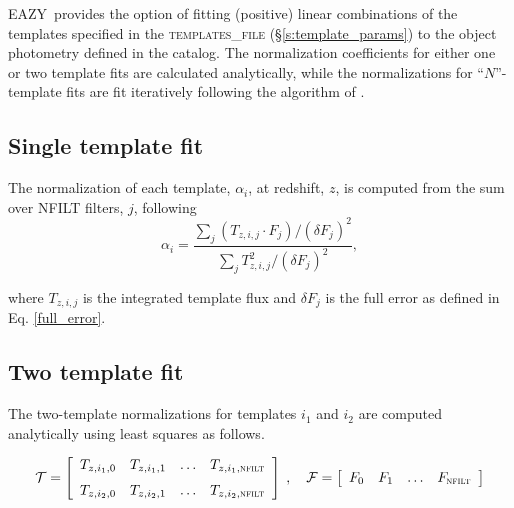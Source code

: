\documentclass[11pt]{article}
\newcommand{\eazy}{\textsc{EAZY}}
\begin{document}

\eazy\ provides the option of fitting (positive) linear combinations of the
templates specified in the \textsc{templates\_file} (\S\ref{s:template_params}) to the
object photometry defined in the catalog.  The normalization coefficients for
either one or two template fits are calculated analytically, while the
normalizations for ``$N$''-template fits are fit iteratively following the
algorithm of \cite{nmf}.

\subsection{Single template fit}

The normalization of each template, $\alpha_i$, at redshift, $z$, is computed
from the sum over \textsc{NFILT} filters, $j$, following
\begin{equation}
\alpha_i = \frac{ \displaystyle\sum_{j}
             \left({T_{z,i,j}\cdot F_j}\right)/\left(\delta F_j\right)^2}
           {\displaystyle\sum_j T_{z,i,j}^2/\left(\delta F_j\right)^2}, \label{eq:alpha1}
\end{equation}

\noindent where $T_{z,i,j}$ is the integrated template flux and $\delta F_j$ is
the full error as defined in Eq. \ref{full_error}.  

\subsection{Two template fit}

The two-template normalizations for templates $i_1$ and $i_2$ are computed analytically using least squares as follows.

\begin{equation}
\mathcal{T} = \left[
\begin {array}{cccc}
T_{z,i_1,0}& T_{z,i_1,1} & \ldots & T_{z,i_1,\textsc{nfilt}} \\
\noalign{\medskip}
T_{z,i_2,0}& T_{z,i_2,1} & \ldots & T_{z,i_2,\textsc{nfilt}} \\
\end {array}
\right]
\;,\ \ \  \mathcal{F} = \left[
\begin {array}{cccc}
F_0 & F_1 & \ldots & F_\textsc{nfilt} \\
\end {array}
\right]
\end{equation}
\end{document}
